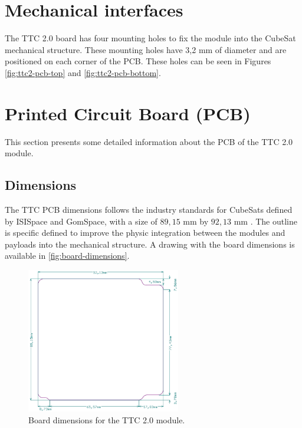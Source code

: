\section{Mechanical interfaces}

The TTC 2.0 board has four mounting holes to fix the module into the CubeSat mechanical structure. These mounting holes have 3,2 mm of diameter and are positioned on each corner of the PCB. These holes can be seen in Figures \ref{fig:ttc2-pcb-top} and \ref{fig:ttc2-pcb-bottom}.

\section{Printed Circuit Board (PCB)}

This section presents some detailed information about the PCB of the TTC 2.0 module.

\subsection{Dimensions}

The TTC PCB dimensions follows the industry standards for CubeSats defined by ISISpace and GomSpace, with a size of $89,15$ mm by $92,13$ mm \cite{nasa-handout}. The outline is specific defined to improve the physic integration between the modules and payloads into the mechanical structure. A drawing with the board dimensions is available in \autoref{fig:board-dimensions}.

\begin{figure}[!ht]
    \begin{center}
        \includegraphics[width=0.6\textwidth]{figures/board-dimensions.png}
        \caption{Board dimensions for the TTC 2.0 module.}
        \label{fig:board-dimensions}
    \end{center}
\end{figure}

